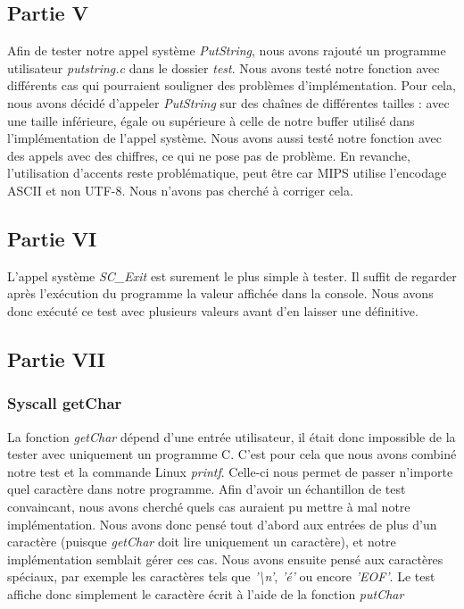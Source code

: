 \documentclass{article}
\begin{document}
\subsection{Partie V}
Afin de tester notre appel système \textit{PutString}, nous avons rajouté un
programme utilisateur \textit{putstring.c }dans le dossier \textit{test}. Nous
avons testé notre fonction avec différents cas qui pourraient souligner des
problèmes d'implémentation. Pour cela, nous avons décidé d'appeler
\textit{PutString} sur des chaînes de différentes tailles : avec une taille
inférieure, égale ou supérieure à celle de notre buffer utilisé dans
l'implémentation de l'appel système. Nous avons aussi testé notre fonction avec
des appels avec des chiffres, ce qui ne pose pas de problème. En revanche,
l'utilisation d'accents reste problématique, peut être car MIPS utilise l'encodage ASCII
et non UTF-8. Nous n'avons pas cherché à corriger cela.

\subsection{Partie VI}
L'appel système \textit{SC\_Exit} est surement le plus simple à tester.
Il suffit de regarder après l'exécution du programme la valeur affichée dans la console.
Nous avons donc exécuté ce test avec plusieurs valeurs avant d'en laisser une définitive.

\subsection{Partie VII}
\subsubsection{Syscall getChar}
La fonction \textit{getChar} dépend d'une entrée utilisateur, il était donc
impossible de la tester avec uniquement un programme C. C'est pour cela que
nous avons combiné notre test et la commande Linux \textit{printf}. Celle-ci
nous permet de passer n'importe quel caractère dans notre programme. Afin
d'avoir un échantillon de test convaincant, nous avons cherché quels cas
auraient pu mettre à mal notre implémentation. Nous avons donc pensé tout
d'abord aux entrées de plus d'un caractère (puisque \textit{getChar} doit lire
uniquement un caractère), et notre implémentation semblait gérer ces cas. Nous
avons ensuite pensé aux caractères spéciaux, par exemple les caractères tels
que \textit{'\textbackslash n'}, \textit{'é'} ou encore \textit{'EOF'}. Le test
affiche donc simplement le caractère écrit à l'aide de la fonction
\textit{putChar}
\end{document}
